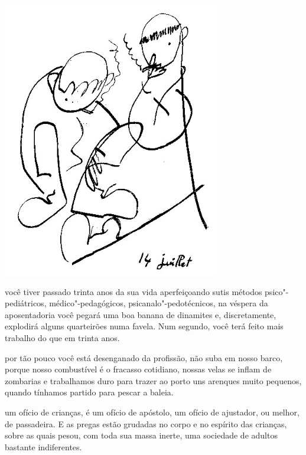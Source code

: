 \begin{vplace}[.50]
\begin{center}
\includegraphics[width=95mm]{./imgs/Image_13.jpg}
\end{center}
\end{vplace}

\pagebreak
\thispagestyle{empty}


\movetooddpage


 você tiver passado trinta anos da sua vida aperfeiçoando sutis
métodos psico"-pediátricos, médico"-pedagógicos, psicanalo"-pedotécnicos,
na véspera da aposentadoria você pegará uma boa banana de dinamites e,
discretamente, explodirá alguns quarteirões numa favela. Num segundo,
você terá feito mais trabalho do que em trinta anos.

\bigskip
\bigskip

 por tão pouco você está desenganado da profissão, não suba em nosso
barco, porque nosso combustível é o fracasso cotidiano, nossas velas se
inflam de zombarias e trabalhamos duro para trazer ao porto uns arenques
muito pequenos, quando tínhamos partido para pescar a baleia.

\bigskip
\bigskip

 um ofício de crianças, é um ofício de apóstolo, um ofício de
ajustador, ou melhor, de passadeira. E as pregas estão grudadas no corpo
e no espírito das crianças, sobre as quais pesou, com toda sua massa
inerte, uma sociedade de adultos bastante indiferentes.

\pagebreak
\thispagestyle{empty}